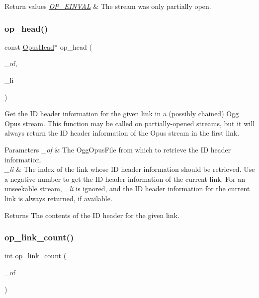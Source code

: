 \begin{DoxyRetVals}{Return values}
{\em \mbox{\hyperlink{group__error__codes_gae0879acafe9cc0ab72462d291fdb6fb6}{O\+P\+\_\+\+E\+I\+N\+V\+AL}}} & The stream was only partially open. \\
\hline
\end{DoxyRetVals}
\mbox{\label{group__stream__info_gabae95dfa8a278a305213332e295443bb}} 
\subsubsection{\texorpdfstring{op\_head()}{op\_head()}}
{\footnotesize\ttfamily const \mbox{\hyperlink{struct_opus_head}{Opus\+Head}}$\ast$ op\+\_\+head (\begin{DoxyParamCaption}\item[{const Ogg\+Opus\+File $\ast$}]{\+\_\+of,  }\item[{int}]{\+\_\+li }\end{DoxyParamCaption})}

Get the ID header information for the given link in a (possibly chained) Ogg Opus stream. This function may be called on partially-\/opened streams, but it will always return the ID header information of the Opus stream in the first link. 
\begin{DoxyParams}{Parameters}
{\em \+\_\+of} & The {\ttfamily Ogg\+Opus\+File} from which to retrieve the ID header information. \\
\hline
{\em \+\_\+li} & The index of the link whose ID header information should be retrieved. Use a negative number to get the ID header information of the current link. For an unseekable stream, {\itshape \+\_\+li} is ignored, and the ID header information for the current link is always returned, if available. \\
\hline
\end{DoxyParams}
\begin{DoxyReturn}{Returns}
The contents of the ID header for the given link. 
\end{DoxyReturn}
\mbox{\label{group__stream__info_gaaf6ff40725a8bc7e73c9d396ab91837d}} 
\subsubsection{\texorpdfstring{op\_link\_count()}{op\_link\_count()}}
{\footnotesize\ttfamily int op\+\_\+link\+\_\+count (\begin{DoxyParamCaption}\item[{const Ogg\+Opus\+File $\ast$}]{\+\_\+of }\end{DoxyParamCaption})}

